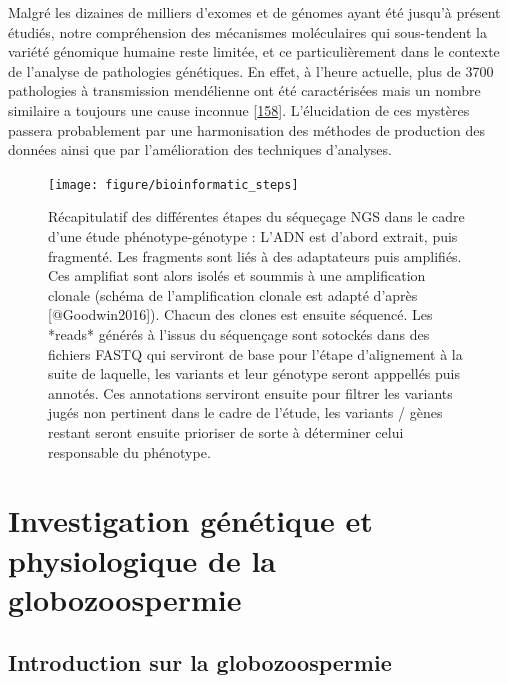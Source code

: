 \documentclass[12pt,twoside]{ugathesis}
\theoremstyle{definition}
\theoremstyle{definition}
\theoremstyle{remark}
\begin{document}
Malgré les dizaines de milliers d'exomes et de génomes ayant été jusqu'à
présent étudiés, notre compréhension des mécanismes moléculaires qui
sous-tendent la variété génomique humaine reste limitée, et ce
particulièrement dans le contexte de l'analyse de pathologies
génétiques. En effet, à l'heure actuelle, plus de 3700 pathologies à
transmission mendélienne ont été caractérisées mais un nombre similaire
a toujours une cause inconnue
{[}\protect\hyperlink{ref-Amberger2011}{158}{]}. L'élucidation de ces
mystères passera probablement par une harmonisation des méthodes de
production des données ainsi que par l'amélioration des techniques
d'analyses.

\newpage 

\begin{figure}

{\centering \texttt{[image: figure/bioinformatic\_steps]} 

}

\caption[Récapitulatif des différentes étapes du séqueçage NGS dans le cadre d'une étude phénotype-génotype]{Récapitulatif des différentes étapes du séqueçage NGS dans le cadre d'une étude phénotype-génotype : L'ADN est d'abord extrait, puis fragmenté. Les fragments sont liés à des adaptateurs puis amplifiés. Ces amplifiat sont alors isolés et soummis à une amplification clonale (schéma de l'amplification clonale est adapté d'après [@Goodwin2016]). Chacun des clones est ensuite séquencé. Les *reads* générés à l'issus du séquençage sont sotockés dans des fichiers FASTQ qui serviront de base pour l'étape d'alignement à la suite de laquelle, les variants et leur génotype seront apppellés puis annotés. Ces annotations serviront ensuite pour filtrer les variants jugés non pertinent dans le cadre de l'étude, les variants / gènes restant seront ensuite prioriser de sorte à déterminer celui responsable du phénotype.}\label{fig:pictrecapngssteps}
\end{figure}

\hypertarget{globo}{\chapter{Investigation génétique et physiologique de
la globozoospermie}\label{globo}}

\section{Introduction sur la
globozoospermie}\label{introduction-sur-la-globozoospermie}
\end{document}
